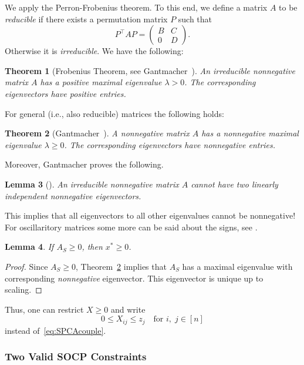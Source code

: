 \documentclass[10pt, a4paper]{article}
\newcommand{\T}{^{\top}}
\newtheorem{theorem}{Theorem}
\newtheorem{lemma}[theorem]{Lemma}
\begin{document}
We apply the Perron-Frobenius theorem. To this end, we define a matrix $A$ to
be \emph{reducible} if there exists a permutation matrix $P$ such that
\[
  P\T A P = \begin{pmatrix} B & C \\ 0 & D \end{pmatrix}.
\]
Otherwise it is \emph{irreducible}. We have the following:

\begin{theorem}[{Frobenius Theorem, see Gantmacher~\cite[Chapter 2, Thm.~2]{Gan59II}}]\label{thm:PerronFrobenius}
  An irreducible nonnegative matrix $A$ has a positive maximal eigenvalue
  $\lambda > 0$. The corresponding eigenvectors have positive entries.
\end{theorem}

For general (i.e., also reducible) matrices the following holds:
\begin{theorem}[{Gantmacher~\cite[Chapter 2, Thm.~3]{Gan59II}}]\label{thm:PerronFrobeniusNonnegative}
  A nonnegative matrix $A$ has a nonnegative maximal eigenvalue
  $\lambda \geq 0$. The corresponding eigenvectors have nonnegative
  entries.
\end{theorem}

Moreover, Gantmacher proves the following.
\begin{lemma}[{\cite[Chapter 2, Remark 3]{Gan59II}}]\label{lemma:PFNegative}
  An irreducible nonnegative matrix $A$ cannot have two linearly
  independent nonnegative eigenvectors.
\end{lemma}
This implies that all eigenvectors to all other eigenvalues cannot be nonnegative!
For oscillaritory matrices some more can be said about the signs, see
\cite[Chapter 2, Theorem~13]{Gan59II}.

\begin{lemma}
  If $A_S \geq 0$, then $x^* \geq 0$.
\end{lemma}

\begin{proof}
  Since $A_S \geq 0$, Theorem~\ref{thm:PerronFrobeniusNonnegative} implies
  that $A_S$ has a maximal eigenvalue with corresponding \emph{nonnegative}
  eigenvector. This eigenvector is unique up to scaling.
\end{proof}

Thus, one can restrict $X \geq 0$ and write
\[
  0 \leq X_{ij} \leq z_j \quad \text{for } i,\; j \in [n]
\]
instead of~\eqref{eq:SPCAcouple}.

\subsubsection{Two Valid SOCP Constraints}
\end{document}
